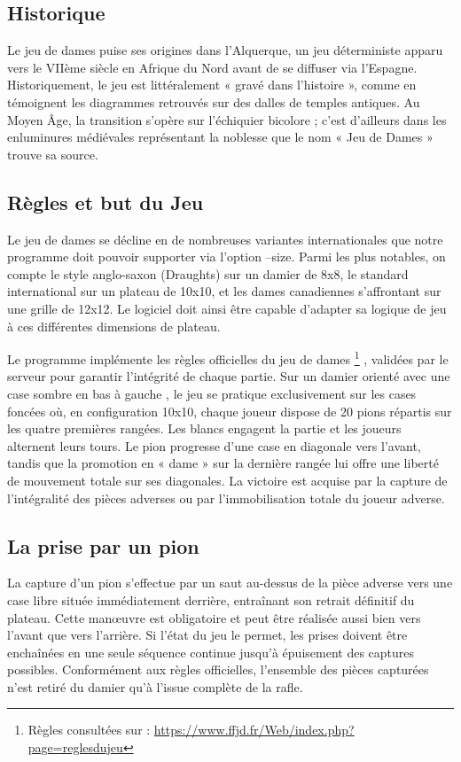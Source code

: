 \documentclass[11pt,a4paper]{article}
\begin{document}
\subsection{Historique}

Le jeu de dames puise ses origines dans l'Alquerque, un jeu déterministe apparu vers le VIIème siècle en Afrique du Nord avant de se diffuser via l'Espagne. Historiquement, le jeu est littéralement « gravé dans l'histoire », comme en témoignent les diagrammes retrouvés sur des dalles de temples antiques. Au Moyen Âge, la transition s'opère sur l'échiquier bicolore ; c'est d'ailleurs dans les enluminures médiévales représentant la noblesse que le nom « Jeu de Dames » trouve sa source.

\subsection{Règles et but du Jeu}

Le jeu de dames se décline en de nombreuses variantes internationales que notre programme doit pouvoir supporter via l'option --size. Parmi les plus notables, on compte le style anglo-saxon (Draughts) sur un damier de 8x8, le standard international sur un plateau de 10x10, et les dames canadiennes s'affrontant sur une grille de 12x12. Le logiciel doit ainsi être capable d'adapter sa logique de jeu à ces différentes dimensions de plateau.

Le programme implémente les règles officielles du jeu de dames \footnote{Règles consultées sur : \url{https://www.ffjd.fr/Web/index.php?page=reglesdujeu}}
, validées par le serveur pour garantir l'intégrité de chaque partie. Sur un damier orienté avec une case sombre en bas à gauche , le jeu se pratique exclusivement sur les cases foncées où, en configuration 10x10, chaque joueur dispose de 20 pions répartis sur les quatre premières rangées. Les blancs engagent la partie et les joueurs alternent leurs tours. Le pion progresse d'une case en diagonale vers l'avant, tandis que la promotion en « dame » sur la dernière rangée lui offre une liberté de mouvement totale sur ses diagonales. La victoire est acquise par la capture de l’intégralité des pièces adverses ou par l'immobilisation totale du joueur adverse.

\subsection{La prise par un pion}

La capture d'un pion s'effectue par un saut au-dessus de la pièce adverse vers une case libre située immédiatement derrière, entraînant son retrait définitif du plateau. Cette manœuvre est obligatoire et peut être réalisée aussi bien vers l'avant que vers l'arrière. Si l'état du jeu le permet, les prises doivent être enchaînées en une seule séquence continue jusqu'à épuisement des captures possibles. Conformément aux règles officielles, l'ensemble des pièces capturées n'est retiré du damier qu'à l'issue complète de la rafle.
\end{document}
